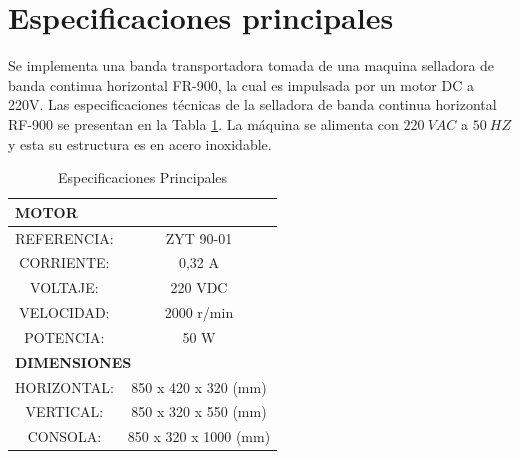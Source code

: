 	\section{Especificaciones principales}
		Se implementa una banda transportadora tomada de una maquina selladora de banda continua horizontal FR-900, la cual es impulsada por un motor DC a 220V. Las especificaciones técnicas de la selladora de banda continua horizontal RF-900 se presentan en la Tabla \ref{fig:principales}. La máquina se alimenta con $220 \ VAC$ a $50 \ HZ$ y esta su estructura es en acero inoxidable. 
		
		\begin{table}[ht]
			\centering
			\begin{tabular}{|c|c|c|c|}
				\hline
				\multicolumn{4}{|l|}{\textbf{MOTOR}} \bigstrut\\
				\hline
				\multicolumn{2}{|c|}{REFERENCIA:} & \multicolumn{2}{c|}{ZYT 90-01} \bigstrut\\
				\hline
				\multicolumn{2}{|c|}{CORRIENTE:} & \multicolumn{2}{c|}{0,32 A} \bigstrut\\
				\hline
				\multicolumn{2}{|c|}{VOLTAJE:} & \multicolumn{2}{c|}{220 VDC} \bigstrut\\
				\hline
				\multicolumn{2}{|c|}{VELOCIDAD:} & \multicolumn{2}{c|}{2000 r/min} \bigstrut\\
				\hline
				\multicolumn{2}{|c|}{POTENCIA:} & \multicolumn{2}{c|}{50 W} \bigstrut\\
				\hline
				\multicolumn{4}{|l|}{\textbf{DIMENSIONES}} \bigstrut\\
				\hline
				\multicolumn{2}{|c|}{HORIZONTAL:} & \multicolumn{2}{c|}{850 x 420 x 320 (mm)} \bigstrut\\
				\hline
				\multicolumn{2}{|c|}{VERTICAL:} & \multicolumn{2}{c|}{850 x 320 x 550 (mm)} \bigstrut\\
				\hline
				\multicolumn{2}{|c|}{CONSOLA:} & \multicolumn{2}{c|}{850 x 320 x 1000 (mm)} \bigstrut\\
				\hline
			\end{tabular}%
			\caption{Especificaciones Principales}
			\label{fig:principales}
		\end{table}%
		
	
	\newpage
